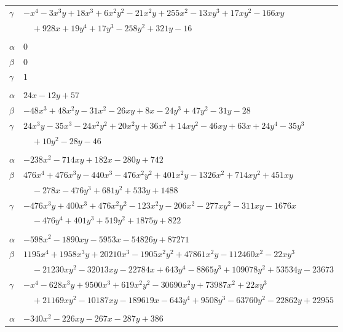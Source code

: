 \documentclass[11pt]{article}
\begin{document}
\begin{longtable}{@{}ll@{}}
$\gamma$ & $-x^{4}-3x^{3}y+18x^{3}+6x^{2}y^{2}-21x^{2}y+255x^{2}-13xy^{3}+17xy^{2}-166xy$\\
 & $\quad +928x+19y^{4}+17y^{3}-258y^{2}+321y-16$\\
\addlinespace[3pt]
\multicolumn{2}{@{}l}{$\{i,j\}=\{2,195\}$, $k_{ij}=2\cdot 5$}\\
$\alpha$ & $0$\\
$\beta$ & $0$\\
$\gamma$ & $1$\\
\addlinespace[3pt]
\multicolumn{2}{@{}l}{$\{i,j\}=\{3,46\}$, $k_{ij}=3^{3}\cdot 7$}\\
$\alpha$ & $24x-12y+57$\\
$\beta$ & $-48x^{3}+48x^{2}y-31x^{2}-26xy+8x-24y^{3}+47y^{2}-31y-28$\\
$\gamma$ & $24x^{3}y-35x^{3}-24x^{2}y^{2}+20x^{2}y+36x^{2}+14xy^{2}-46xy+63x+24y^{4}-35y^{3}$\\
 & $\quad +10y^{2}-28y-46$\\
\addlinespace[3pt]
\multicolumn{2}{@{}l}{$\{i,j\}=\{3,55\}$, $k_{ij}=2^{3}\cdot 3^{4}\cdot 7$}\\
$\alpha$ & $-238x^{2}-714xy+182x-280y+742$\\
$\beta$ & $476x^{4}+476x^{3}y-440x^{3}-476x^{2}y^{2}+401x^{2}y-1326x^{2}+714xy^{2}+451xy$\\
 & $\quad -278x-476y^{3}+681y^{2}+533y+1488$\\
$\gamma$ & $-476x^{3}y+400x^{3}+476x^{2}y^{2}-123x^{2}y-206x^{2}-277xy^{2}-311xy-1676x$\\
 & $\quad -476y^{4}+401y^{3}+519y^{2}+1875y+822$\\
\addlinespace[3pt]
\multicolumn{2}{@{}l}{$\{i,j\}=\{3,100\}$, $k_{ij}=2^{2}\cdot 3^{5}\cdot 5\cdot 7^{2}$}\\
$\alpha$ & $-598x^{2}-1890xy-5953x-54826y+87271$\\
$\beta$ & $1195x^{4}+1958x^{3}y+20210x^{3}-1905x^{2}y^{2}+47861x^{2}y-112460x^{2}-22xy^{3}$\\
 & $\quad -21230xy^{2}-32013xy-22784x+643y^{4}-8865y^{3}+109078y^{2}+53534y-23673$\\
$\gamma$ & $-x^{4}-628x^{3}y+9500x^{3}+619x^{2}y^{2}-30690x^{2}y+73987x^{2}+22xy^{3}$\\
 & $\quad +21169xy^{2}-10187xy-189619x-643y^{4}+9508y^{3}-63760y^{2}-22862y+22955$\\
\addlinespace[3pt]
\multicolumn{2}{@{}l}{$\{i,j\}=\{3,101\}$, $k_{ij}=2^{3}\cdot 3^{3}\cdot 7$}\\
$\alpha$ & $-340x^{2}-226xy-267x-287y+386$\\

\end{longtable}
\end{document}
